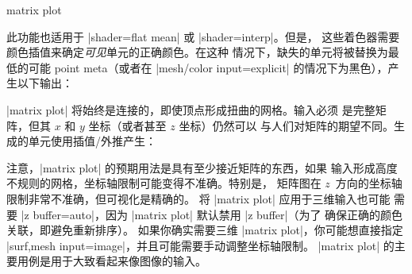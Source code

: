 {\begin{plottype}[/pgfplots]{matrix plot}
\begin{codeexample}[]
\end{codeexample}
    此功能也适用于 |shader=flat mean| 或 |shader=interp|。但是，
    这些着色器需要颜色插值来确定\emph{可见}单元的正确颜色。在这种
    情况下，缺失的单元将被替换为最低的可能 point meta（或者在
    |mesh/color input=explicit| 的情况下为黑色），产生以下输出：
\begin{codeexample}[]
\end{codeexample}

    |matrix plot| 将始终是连接的，即使顶点形成扭曲的网格。输入必须
    是完整矩阵，但其 $x$ 和 $y$ 坐标（或者甚至 $z$ 坐标）仍然可以
    与人们对矩阵的期望不同。生成的单元使用插值/外推产生：
\begin{codeexample}[]
\end{codeexample}
    注意，|matrix plot| 的预期用法是具有至少接近矩阵的东西，如果
    输入形成高度不规则的网格，坐标轴限制可能变得不准确。特别是，
    矩阵图在 $z$~方向的坐标轴限制非常不准确，但可视化是精确的。
    将 |matrix plot| 应用于三维输入也可能
        需要 |z buffer=auto|，因为 |matrix plot| 默认禁用 |z buffer|（为了
        确保正确的颜色关联，即\@ 避免重新排序）。
    如果你确实需要三维 |matrix plot|，你可能想直接指定
    |surf,mesh input=image|，并且可能需要手动调整坐标轴限制。
    |matrix plot| 的主要用例是用于大致看起来像图像的输入。


\end{plottype}}
